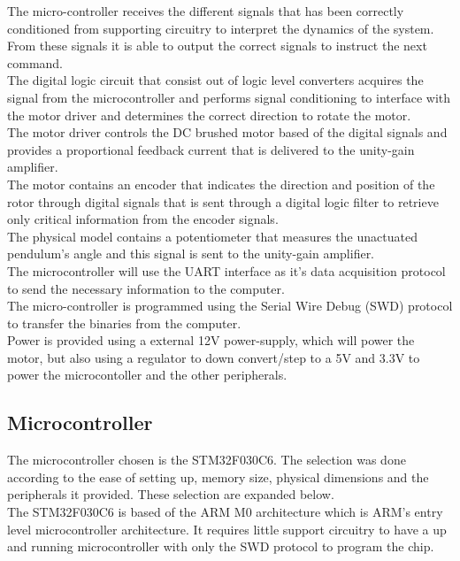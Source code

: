 The micro-controller receives the different signals that has been correctly conditioned from supporting circuitry to interpret the dynamics of the system. From these signals it is able to output the correct signals to instruct the next command.\\

The digital logic circuit that consist out of logic level converters acquires the signal from the microcontroller and performs signal conditioning to interface with the motor driver and determines the correct direction to rotate the motor. \\

The motor driver controls the DC brushed motor based of the digital signals and provides a proportional feedback current that is delivered to the unity-gain amplifier.\\

The motor contains an encoder that indicates the direction and position of the rotor through digital signals that is sent through a digital logic filter to retrieve only critical information from the encoder signals. \\

The physical model contains a potentiometer that measures the unactuated pendulum's angle and this signal is sent to the unity-gain amplifier.\\

The microcontroller will use the UART interface as it's data acquisition protocol to send the necessary information to the computer. \\

The micro-controller is programmed using the Serial Wire Debug (SWD) protocol to transfer the binaries from the computer.\\

Power is provided using a external 12V power-supply, which will power the motor, but also using a regulator to down convert/step to a 5V and 3.3V to power the microcontoller and the other peripherals.


\subsection{Microcontroller}
The microcontroller chosen is the STM32F030C6. The selection was done according to the ease of setting up, memory size, physical dimensions and the peripherals it provided. These selection are expanded below.\\

The STM32F030C6 is based of the ARM M0 architecture which is ARM's entry level microcontroller architecture. It requires little support circuitry to have a up and running microcontroller with only the SWD protocol to program the chip.\\

